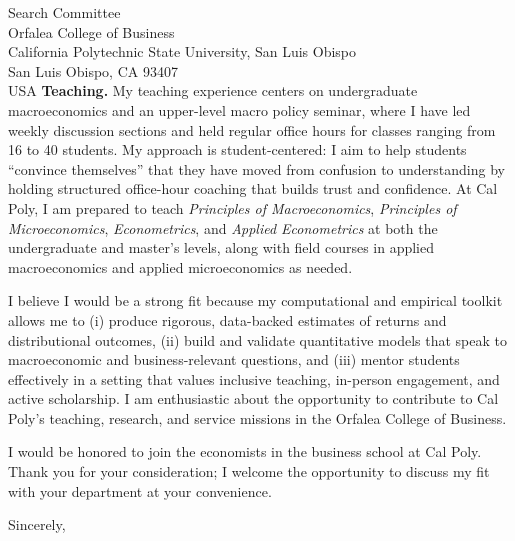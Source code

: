 \documentclass[11pt,letterpaper]{letter}
\begin{document}
\begin{letter}{Search Committee \\
Orfalea College of Business \\
California Polytechnic State University, San Luis Obispo \\
San Luis Obispo, CA 93407 \\ USA}
\textbf{Teaching.} My teaching experience centers on undergraduate macroeconomics and an upper-level macro policy seminar, where I have led weekly discussion sections and held regular office hours for classes ranging from 16 to 40 students. My approach is student-centered: I aim to help students “convince themselves” that they have moved from confusion to understanding by holding structured office-hour coaching that builds trust and confidence. At Cal Poly, I am prepared to teach \textit{Principles of Macroeconomics}, \textit{Principles of Microeconomics}, \textit{Econometrics}, and \textit{Applied Econometrics} at both the undergraduate and master’s levels, along with field courses in applied macroeconomics and applied microeconomics as needed.

I believe I would be a strong fit because my computational and empirical toolkit allows me to (i) produce rigorous, data-backed estimates of returns and distributional outcomes, (ii) build and validate quantitative models that speak to macroeconomic and business-relevant questions, and (iii) mentor students effectively in a setting that values inclusive teaching, in-person engagement, and active scholarship. I am enthusiastic about the opportunity to contribute to Cal Poly’s teaching, research, and service missions in the Orfalea College of Business.

I would be honored to join the economists in the business school at Cal Poly. Thank you for your consideration; I welcome the opportunity to discuss my fit with your department at your convenience.

\closing{Sincerely,}

\end{letter}
\end{document}
